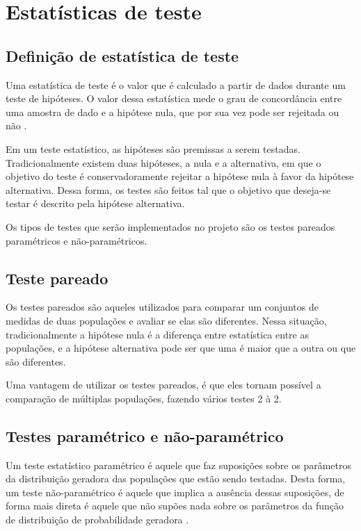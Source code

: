 


\chapter{Estatísticas de teste}
\label{chap:testStatistics}

\section{Definição de estatística de teste}
Uma estatística de teste é o valor que é calculado a partir de dados durante um teste de hipóteses. O valor dessa estatística mede o grau de concordância entre uma amostra de dado e a hipótese nula, que por sua vez pode ser rejeitada ou não \cite{Casella2002}. 

Em um teste estatístico, as hipóteses são premissas a serem testadas. Tradicionalmente existem duas hipóteses, a nula e a alternativa, em que o objetivo do teste é conservadoramente rejeitar a hipótese nula à favor da hipótese alternativa. Dessa forma, os testes são feitos tal que o objetivo que deseja-se testar é descrito pela hipótese alternativa.

Os tipos de testes que serão implementados no projeto são os testes pareados paramétricos e não-paramétricos.

\section{Teste pareado}
Os testes pareados são aqueles utilizados para comparar um conjuntos de medidas de duas populações e avaliar se elas são diferentes. Nessa situação, tradicionalmente a hipótese nula é a diferença entre estatística entre as populações, e a hipótese alternativa pode ser que uma é maior que a outra ou que são diferentes.

Uma vantagem de utilizar os testes pareados, é que eles tornam possível a comparação de múltiplas populações, fazendo vários testes 2 à 2.

\section{Testes paramétrico e não-paramétrico}
Um teste estatístico paramétrico é aquele que faz suposições sobre os parâmetros da
distribuição geradora das populações que estão sendo testadas. Desta forma, um teste
não-paramétrico é aquele que implica a ausência dessas suposições, de forma mais direta é
aquele que não supões nada sobre os parâmetros da função de distribuição de probabilidade
geradora \cite{LowryFerro}.

